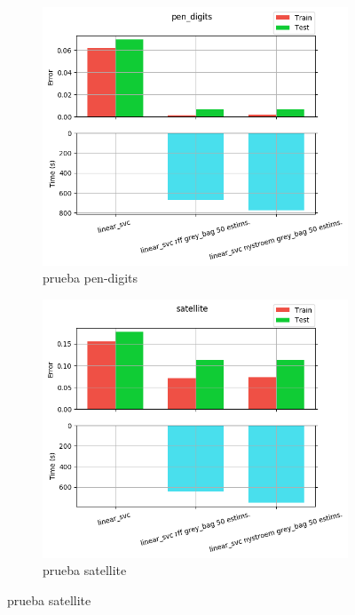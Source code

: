 \begin{figure}[ht]
  \centering
  \begin{subfigure}[b]{0.5\linewidth}
    \centering\includegraphics[width=\imgscale\linewidth]{Figures/2_7/pen_digits}
    \caption{prueba pen-digits}
    \label{fig:2_7_pen_digits}
  \end{subfigure}%
  \begin{subfigure}[b]{0.5\linewidth}
    \centering\includegraphics[width=\imgscale\linewidth]{Figures/2_7/satellite}
    \caption{prueba satellite}
    \label{fig:2_7_satellite}
  \end{subfigure}
\end{figure}

